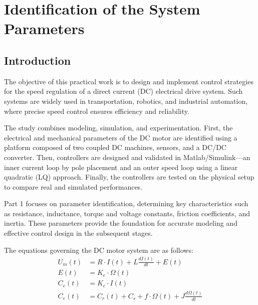 \documentclass{rapportCS}
\begin{document}

\tabledematieres %




\section{Identification of the System Parameters}

\subsection{Introduction}

The objective of this practical work is to design and implement control strategies for the speed regulation of a direct current (DC) electrical drive system. Such systems are widely used in transportation, robotics, and industrial automation, where precise speed control ensures efficiency and reliability.

The study combines modeling, simulation, and experimentation. First, the electrical and mechanical parameters of the DC motor are identified using a platform composed of two coupled DC machines, sensors, and a DC/DC converter. Then, controllers are designed and validated in Matlab/Simulink—an inner current loop by pole placement and an outer speed loop using a linear quadratic (LQ) approach. Finally, the controllers are tested on the physical setup to compare real and simulated performances.

Part 1 focuses on parameter identification, determining key characteristics such as resistance, inductance, torque and voltage constants, friction coefficients, and inertia. These parameters provide the foundation for accurate modeling and effective control design in the subsequent stages.

\vspace{1em}
\noindent The equations governing the DC motor system are as follows:
\begin{align}
U_m(t) &= R \cdot I(t) + L \frac{dI(t)}{dt} + E(t) \label{eq:voltage} \\
E(t) &= K_e \cdot \Omega(t) \label{eq:bemf} \\
C_e(t) &= K_c \cdot I(t) \label{eq:torque} \\
C_e(t) &= C_r(t) + C_s + f \cdot \Omega(t) + J \frac{d\Omega(t)}{dt} \label{eq:mechanical}
\end{align}
\end{document}
